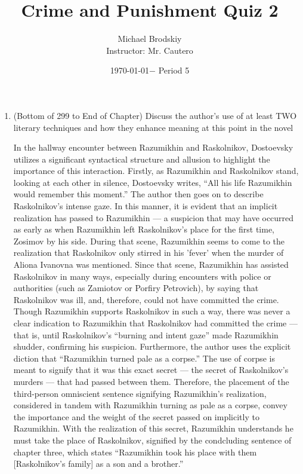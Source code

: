 \documentclass[12pt]{article}
\title{Crime and Punishment Quiz 2}
\date{\today $-$ Period 5}
\author{Michael Brodskiy\\ \small Instructor: Mr. Cautero}
\begin{document}
\maketitle

\begin{enumerate}

\item (Bottom of 299 to End of Chapter) Discuss the author's use of at least TWO literary techniques and how they enhance meaning at this point in the novel

  \begin{justify}

    In the hallway encounter between Razumikhin and Raskolnikov, Dostoevsky utilizes a significant syntactical structure and allusion to highlight the importance of this interaction. Firstly, as Razumikhin and Raskolnikov stand, looking at each other in silence, Dostoevsky writes, “All his life Razumikhin would remember this moment.” The author then goes on to describe Raskolnikov's intense gaze. In this manner, it is evident that an implicit realization has passed to Razumikhin — a suspicion that may have occurred as early as when Razumikhin left Raskolnikov's place for the first time, Zosimov by his side. During that scene, Razumikhin seems to come to the realization that Raskolnikov only stirred in his 'fever' when the murder of Aliona Ivanovna was mentioned. Since that scene, Razumikhin has assisted Raskolnikov in many ways, especially during encounters with police or authorities (such as Zamiotov or Porfiry Petrovich), by saying that Raskolnikov was ill, and, therefore, could not have committed the crime. Though Razumikhin supports Raskolnikov in such a way, there was never a clear indication to Razumikhin that Raskolnikov had committed the crime — that is, until Raskolnikov's “burning and intent gaze” made Razumikhin shudder, confirming his suspicion. Furthermore, the author uses the explicit diction that “Razumikhin turned pale as a corpse.” The use of corpse is meant to signify that it was this exact secret — the secret of Raskolnikov's murders — that had passed between them. Therefore, the placement of the third-person omniscient sentence signifying Razumikhin's realization, considered in tandem with Razumikhin turning as pale as a corpse, convey the importance and the weight of the secret passed on implicitly to Razumikhin. With the realization of this secret, Razumikhin understands he must take the place of Raskolnikov, signified by the condcluding sentence of chapter three, which states “Razumikhin took his place with them [Raskolnikov's family] as a son and a brother.”

  \end{justify}

  \end{enumerate}
\end{document}

